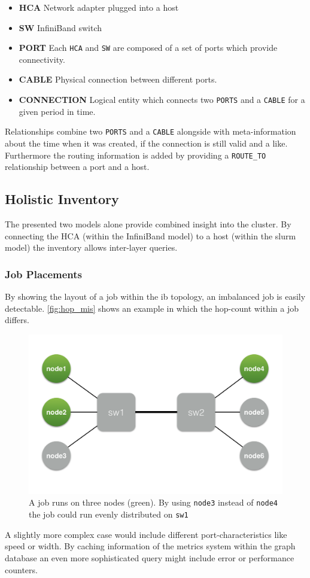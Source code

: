 \begin{itemize}
    \item \textbf{HCA} Network adapter plugged into a host
    \item \textbf{SW} InfiniBand switch
    \item \textbf{PORT} Each \lstinline{HCA} and \lstinline{SW} are composed of a set of ports which provide connectivity.
    \item \textbf{CABLE} Physical connection between different ports.
    \item \textbf{CONNECTION} Logical entity which connects two \lstinline{PORTS} and a \lstinline{CABLE} for a given period in time.
\end{itemize}

Relationships combine two \lstinline{PORTS} and a \lstinline{CABLE} alongside with meta-information about the time when it was created, if the connection is still valid and a like.
Furthermore the routing information is added by providing a \lstinline{ROUTE_TO} relationship between a port and a host.

\subsection{Holistic Inventory}
The presented two models alone provide combined insight into the cluster.
By connecting the HCA (within the InfiniBand model) to a host (within the \gls{slurm} model) the inventory
allows inter-layer queries.

\subsubsection{Job Placements}
By showing the layout of a job within the \gls{ib} topology, an imbalanced job is easily detectable. \autoref{fig:hop_mis} shows an example in which the hop-count within a job differs.
\begin{figure}[!ht]
    \includegraphics[width=.4\textwidth]{images/png/hop_missmatch.png}
    \caption{\label{fig:hop_mis}A job runs on three nodes (green). By using \lstinline{node3} instead of \lstinline{node4} the job could run evenly distributed on \lstinline{sw1}}
\end{figure}
A slightly more complex case would include different port-characteristics like speed or width.
By caching information of the metrics system within the graph database an even more sophisticated query
might include error or performance counters.

